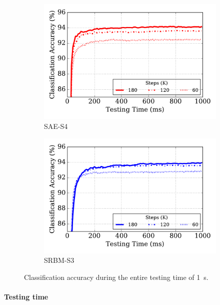 \begin{figure}
	\centering
	\begin{subfigure}[t]{0.48\textwidth}
		\includegraphics[width=\textwidth]{pics_sdlm/43_MNIST_SAE_all/latency.pdf}
		\caption{SAE-S4}
	\end{subfigure}
	\begin{subfigure}[t]{0.48\textwidth}
		\includegraphics[width=\textwidth]{pics_sdlm/51_MNIST_SRBM_teach/latency.pdf}
		\caption{SRBM-S3}
	\end{subfigure}
	\caption[Classification accuracy per time step.]{Classification accuracy during the entire testing time of 1~s.}
	\label{fig:latency}
\end{figure}

\paragraph{Testing time\\}

